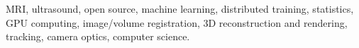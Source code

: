




MRI, ultrasound, open source, machine learning, distributed training, statistics, GPU computing, image/volume registration, 3D reconstruction and rendering, tracking, camera optics, computer science.



